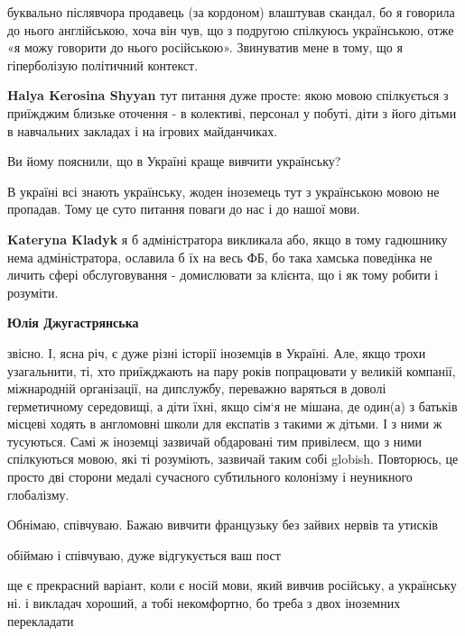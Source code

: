 \begin{itemize}
\begin{itemize}
буквально післявчора продавець (за кордоном) влаштував скандал, бо я говорила
до нього англійською, хоча він чув, що з подругою спілкуюсь українською, отже
«я можу говорити до нього російською». Звинуватив мене в тому, що я
гіперболізую політичний контекст.


\textbf{Halya Kerosina Shyyan} тут питання дуже просте: якою мовою спілкується з приїжджим близьке оточення - в колективі, персонал у побуті, діти з його дітьми в навчальних закладах і на ігрових майданчиках.

Ви йому пояснили, що в Україні краще вивчити українську?

В україні всі знають українську, жоден іноземець тут з українською мовою не пропадав. Тому це суто питання поваги до нас і до нашої мови.

\textbf{Kateryna Kladyk} я б адміністратора викликала або, якщо в тому гадюшнику нема адміністратора, ославила б їх на весь ФБ, бо така хамська поведінка не личить сфері обслуговування - домислювати за клієнта, що і як тому робити і розуміти.

\textbf{Юлія Джугастрянська} 

звісно. І, ясна річ, є дуже різні історії іноземців в Україні. Але, якщо трохи
узагальнити, ті, хто приїжджають на пару років попрацювати у великій компанії,
міжнародній організації, на дипслужбу, переважно варяться в доволі герметичному
середовищі, а діти їхні, якщо сім‘я не мішана, де один(а) з батьків місцеві
ходять в англомовні школи для експатів з такими ж дітьми. І з ними ж тусуються.
Самі ж іноземці зазвичай обдаровані тим привілеєм, що з ними спілкуються мовою,
які ті розуміють, зазвичай таким собі globish. Повторюсь, це просто дві сторони
медалі сучасного субтильного колонізму і неуникного глобалізму.


\end{itemize} %

Обнімаю, співчуваю. Бажаю вивчити французьку без зайвих нервів та утисків

обіймаю і співчуваю, дуже відгукується ваш пост


ще є прекрасний варіант, коли є носій мови, який вивчив російську, а українську
ні. і викладач хороший, а тобі некомфортно, бо треба з двох іноземних
перекладати




\end{itemize}
